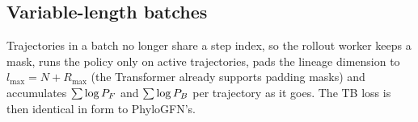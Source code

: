 \subsection{Variable-length batches}
Trajectories in a batch no longer share a step index, so the rollout worker keeps a  mask, runs the policy only on active trajectories, pads the lineage dimension to $l_{\max}=N+R_{\max}$ (the Transformer already supports padding masks) and accumulates $\sum\log P_F$ and $\sum\log P_B$ per trajectory as it goes. The TB loss is then identical in form to PhyloGFN's.
\clearpage
